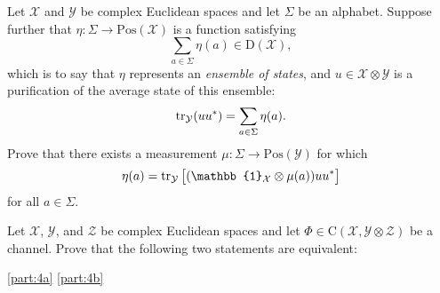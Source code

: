 \documentclass[boxes,pages,color=SeaGreen]{homework}
\newcommand{\I}{\mathbb{1}}
\newcommand{\X}{\mathcal{X}}
\newcommand{\Y}{\mathcal{Y}}
\newcommand{\Z}{\mathcal{Z}}
\newcommand{\W}{\mathcal{W}}
\newcommand{\Lin}{\mathrm{L}}
\newcommand{\Pos}{\mathrm{Pos}}
\newcommand{\Channel}{\mathrm{C}}
\newcommand{\Density}{\mathrm{D}}
\begin{document}
\begin{solution}
\end{solution}


\begin{problem}
Let $\X$ and $\Y$ be complex Euclidean spaces and let $\Sigma$ be an
alphabet.
Suppose further that $\eta:\Sigma\rightarrow\Pos(\X)$ is a function
satisfying
\[
    \sum_{a\in\Sigma} \eta(a) \in \Density(\X),
\]
which is to say that $\eta$ represents an \emph{ensemble of states},
and $u\in\X\otimes\Y$ is a purification of the average state of this
ensemble:
\[
    \tr_{\Y}( u u^{\ast} ) = \sum_{a\in\Sigma} \eta(a).
\]
Prove that there exists a measurement $\mu:\Sigma\rightarrow\Pos(\Y)$ for
which
\[
    \eta(a) = \tr_{\Y} \qty\big[(\I_{\X}\otimes\mu(a))u u^{\ast}]
\]
for all $a\in\Sigma$.
\end{problem}

\begin{solution}
\end{solution}


\begin{problem}
Let $\X$, $\Y$, and $\Z$ be complex Euclidean spaces and let
$\Phi\in\Channel(\X,\Y\otimes\Z)$ be a channel.
Prove that the following two statements are equivalent:
\end{problem}

\begin{solution}
    \ref{part:4a}
    \ref{part:4b}
\end{solution}
\end{document}
